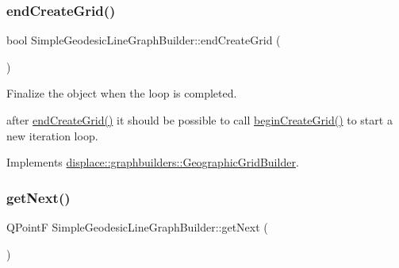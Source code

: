 \mbox{\label{classdisplace_1_1graphbuilders_1_1_simple_geodesic_line_graph_builder_a61e96188c1a6eb7366bc252e9a5f7d53}} 
\subsubsection{\texorpdfstring{endCreateGrid()}{endCreateGrid()}}
{\footnotesize\ttfamily bool Simple\+Geodesic\+Line\+Graph\+Builder\+::end\+Create\+Grid (\begin{DoxyParamCaption}{ }\end{DoxyParamCaption})\hspace{0.3cm}{\ttfamily [virtual]}}



Finalize the object when the loop is completed. 

after \mbox{\hyperlink{classdisplace_1_1graphbuilders_1_1_simple_geodesic_line_graph_builder_a61e96188c1a6eb7366bc252e9a5f7d53}{end\+Create\+Grid()}} it should be possible to call \mbox{\hyperlink{classdisplace_1_1graphbuilders_1_1_simple_geodesic_line_graph_builder_a87d7dbaefebb501f491fc4bb2afeb8eb}{begin\+Create\+Grid()}} to start a new iteration loop. 

Implements \mbox{\hyperlink{classdisplace_1_1graphbuilders_1_1_geographic_grid_builder_ac5f018a1c87a2e1274ff620ee7b374a6}{displace\+::graphbuilders\+::\+Geographic\+Grid\+Builder}}.

\mbox{\label{classdisplace_1_1graphbuilders_1_1_simple_geodesic_line_graph_builder_a219f40fcae3c1463aa7f818687ed5f39}} 
\subsubsection{\texorpdfstring{getNext()}{getNext()}}
{\footnotesize\ttfamily Q\+PointF Simple\+Geodesic\+Line\+Graph\+Builder\+::get\+Next (\begin{DoxyParamCaption}{ }\end{DoxyParamCaption})\hspace{0.3cm}{\ttfamily [virtual]}}



